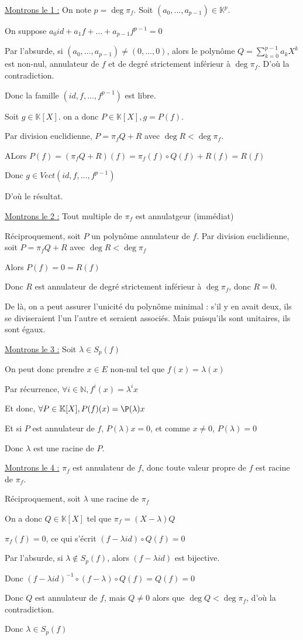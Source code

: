 \documentclass[a4paper,12pt]{book}
\newcommand{\Pre}[1]{\begin{tcolorbox}[sharp corners, colback=white,colframe=green!60!green!30!black!75, title=Preuve]#1\end{tcolorbox}}
\def\N{\mathbb{N}}
\def\K{\mathbb{K}}
\begin{document}
\Pre{\underline{Montrons le 1 :} On note $p=\deg\pi_f$. Soit $(a_0,..., a_{p-1})\in\K^p$. \par On suppose $a_0id + a_1f + ... + a_{p-1}f^{p-1}=0$ \par Par l'absurde, si $(a_0,...,a_{p-1})\neq (0,...,0)$, alors le polynôme $Q=\sum\limits_{k=0}^{p-1}a_kX^k$ est non-nul, annulateur de $f$ et de degré strictement inférieur à $\deg\pi_f$. D'où la contradiction. \par Donc la famille $(id,f,...,f^{p-1})$ est libre.
\par Soit $g\in\K[X]$. on a donc $P\in\K[X], g=P(f)$. \par Par division euclidienne, $P=\pi_fQ + R$ avec $\deg R< \deg\pi_f$. \par ALors $P(f)=(\pi_fQ+R)(f) = \pi_f(f)\circ Q(f) + R(f) = R(f)$ \par Donc $g\in Vect(id,f,..., f^{p-1})$ \par D'où le résultat.
\par \underline{Montrons le 2 :} Tout multiple de $\pi_f$ est annulatgeur (immédiat) \par Réciproquement, soit $P$ un polynôme annulateur de $f$. Par division euclidienne, soit $P = \pi_fQ+R$ avec $\deg R<\deg\pi_f$ \par Alors $P(f) = 0 = R(f)$ \par Donc $R$ est annulateur de degré strictement inférieur à $\deg\pi_f$, donc $R=0$. \par De là, on a peut assurer l'unicité du polynôme minimal : s'il y en avait deux, ils se diviseraient l'un l'autre et seraient associés. Mais puisqu'ils sont unitaires, ils sont égaux.
\par \underline{Montrons le 3 :} Soit $\lambda\in S_p(f)$ \par On peut donc prendre $x\in E$ non-nul tel que $f(x)=\lambda(x)$ \par Par récurrence, $\forall i\in\N, f^i(x) = \lambda^ix$ \par Et donc, $\forall P\in\K[X], P(f)(x) = \P(\lambda)x$ \par Et si $P$ est annulateur de $f$, $P(\lambda)x=0$, et comme $x\neq 0$, $P(\lambda)=0$ \par Donc $\lambda$ est une racine de $P$.
\par \underline{Montrons le 4 :} $\pi_f$ est annulateur de $f$, donc toute valeur propre de $f$ est racine de $\pi_f$. \par Réciproquement, soit $\lambda$ une racine de $\pi_f$ \par On a donc $Q\in\K[X]$ tel que $\pi_f=(X-\lambda)Q$ \par $\pi_f(f)=0$, ce qui s'écrit $(f-\lambda id)\circ Q(f) = 0$ \par Par l'absurde, si $\lambda\notin S_p(f)$, alors $(f-\lambda id)$ est bijective. \par Donc $(f-\lambda id)^{-1}\circ(f-\lambda)\circ Q(f) = Q(f) = 0$ \par Donc $Q$ est annulateur de $f$, mais $Q\neq 0$ alors que $\deg Q<\deg\pi_f$, d'où la contradiction. \par Donc $\lambda\in S_p(f)$}
\end{document}
